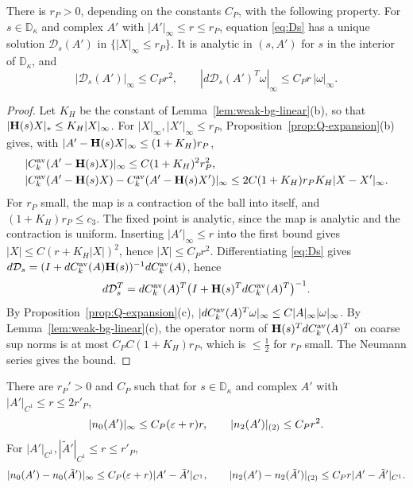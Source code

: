 \begin{lemma}\label{lem:Ds}
There is $r_P>0$, depending on the constants $C_P$, with the following property. For $s\in\mathbb D_\kappa$ and complex $A'$ with $|A'|_\infty\le r\le r_P$, equation \eqref{eq:Ds} has a unique solution $\mathcal D_s(A')$ in $\{|X|_\infty\le r_P\}$. It is analytic in $(s,A')$ for $s$ in the interior of $\mathbb D_\kappa$, and
\[
|\mathcal D_s(A')|_\infty\le C_Pr^2,\qquad|d\mathcal D_s(A')^T\omega|_\infty\le C_Pr\,|\omega|_\infty .
\]
\end{lemma}

\begin{proof}
Let $K_H$ be the constant of Lemma~\ref{lem:weak-bg-linear}(b), so that $|\mathbf H(s)X|_*\le K_H|X|_\infty$. For $|X|_\infty,|X'|_\infty\le r_P$, Proposition~\ref{prop:Q-expansion}(b) gives, with $|A'-\mathbf H(s)X|_\infty\le(1+K_H)r_P$,
\[
\begin{aligned}
&|C^{\rm av}_k(A'-\mathbf H(s)X)|_\infty\le C(1+K_H)^2r_P^2,\\
&|C^{\rm av}_k(A'-\mathbf H(s)X)-C^{\rm av}_k(A'-\mathbf H(s)X')|_\infty\le2C(1+K_H)r_PK_H|X-X'|_\infty .
\end{aligned}
\]
For $r_P$ small, the map is a contraction of the ball into itself, and $(1+K_H)r_P\le c_3$. The fixed point is analytic, since the map is analytic and the contraction is uniform. Inserting $|A'|_\infty\le r$ into the first bound gives $|X|\le C(r+K_H|X|)^2$, hence $|X|\le C_Pr^2$. Differentiating \eqref{eq:Ds} gives $d\mathcal D_s=(I+dC^{\rm av}_k(A)\mathbf H(s))^{-1}dC^{\rm av}_k(A)$, hence
\[
d\mathcal D_s^T=dC^{\rm av}_k(A)^T\big(I+\mathbf H(s)^TdC^{\rm av}_k(A)^T\big)^{-1}.
\]
By Proposition~\ref{prop:Q-expansion}(c), $|dC^{\rm av}_k(A)^T\omega|_\infty\le C|A|_\infty|\omega|_\infty$. By Lemma~\ref{lem:weak-bg-linear}(c), the operator norm of $\mathbf H(s)^TdC^{\rm av}_k(A)^T$ on coarse sup norms is at most $C_PC(1+K_H)r_P$, which is $\le\frac12$ for $r_P$ small. The Neumann series gives the bound.
\end{proof}

\begin{lemma}\label{lem:gradV-s}
There are $r_P'>0$ and $C_P$ such that for $s\in\mathbb D_\kappa$ and complex $A'$ with $|A'|_{C^1}\le r\le2r'_P$,
\[
|n_0(A')|_\infty\le C_P(\varepsilon+r)r,\qquad|n_2(A')|_{(2)}\le C_Pr^2 .
\]
For $|A'|_{C^1},|\tilde A'|_{C^1}\le r\le r'_P$,
\[
|n_0(A')-n_0(\tilde A')|_\infty\le C_P(\varepsilon+r)|A'-\tilde A'|_{C^1},\qquad|n_2(A')-n_2(\tilde A')|_{(2)}\le C_Pr|A'-\tilde A'|_{C^1} .
\]
\end{lemma}

